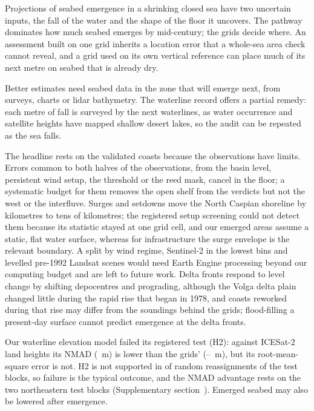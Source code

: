 
Projections of seabed emergence in a shrinking closed sea have two uncertain inputs, the fall of the water and the shape of the floor it uncovers. The pathway dominates how much seabed emerges by mid-century; the grids decide where. An assessment built on one grid\citep{court2025,duan2025} inherits a location error that a whole-sea area check cannot reveal\citep{bocharov2026}, and a grid used on its own vertical reference can place much of its next metre on seabed that is already dry.

Better estimates need seabed data in the zone that will emerge next, from surveys, charts or lidar bathymetry. The waterline record offers a partial remedy: each metre of fall is surveyed by the next waterlines, as water occurrence and satellite heights have mapped shallow desert lakes\citep{armon2020}, so the audit can be repeated as the sea falls.

The headline rests on the validated coasts because the observations have limits. Errors common to both halves of the observations, from the basin level, persistent wind setup, the threshold or the reed mask, cancel in the floor; a systematic budget for them removes the open shelf from the verdicts but not the west or the interfluve. Surges and setdowns move the North Caspian shoreline by kilometres to tens of kilometres\citep{pavlova2020,yeltay2026}; the registered setup screening could not detect them because its statistic stayed at one grid cell, and our emerged areas assume a static, flat water surface, whereas for infrastructure the surge envelope is the relevant boundary. A split by wind regime, Sentinel-2 in the lowest bins and levelled pre-1992 Landsat scenes would need Earth Engine processing beyond our computing budget and are left to future work. Delta fronts respond to level change by shifting depocentres and prograding\citep{kroonenberg1997,overeem2003}, although the Volga delta plain changed little during the rapid rise that began in 1978\citep{li2004}, and coasts reworked during that rise\citep{kravtsova2012} may differ from the soundings behind the grids; flood-filling a present-day surface cannot predict emergence at the delta fronts.

Our waterline elevation model failed its registered test (H2): against ICESat-2 land heights its NMAD (~m) is lower than the grids' (--~m), but its root-mean-square error is not. H2 is not supported in  of  random reassignments of the test blocks, so failure is the typical outcome, and the NMAD advantage rests on the two northeastern test blocks (Supplementary section~\SIrevision). Emerged seabed may also be lowered after emergence\citep{closson2026}.

